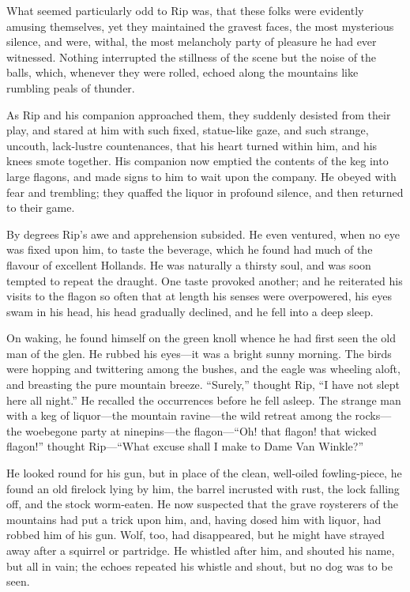 What seemed particularly odd to Rip was, that these folks were evidently amusing themselves, yet they maintained the gravest faces, the most mysterious silence, and were, withal, the most melancholy party of pleasure he had ever witnessed. Nothing interrupted the stillness of the scene but the noise of the balls, which, whenever they were rolled, echoed along the mountains like rumbling peals of thunder.


As Rip and his companion approached them, they suddenly desisted from their play, and stared at him with such fixed, statue-like gaze, and such strange, uncouth, lack-lustre countenances, that his heart turned within him, and his knees smote together. His companion now emptied the contents of the keg into large flagons, and made signs to him to wait upon the company. He obeyed with fear and trembling; they quaffed the liquor in profound silence, and then returned to their game.

By degrees Rip’s awe and apprehension subsided. He even ventured, when no eye was fixed upon him, to taste the beverage, which he found had much of the flavour of excellent Hollands. He was naturally a thirsty soul, and was soon tempted to repeat the draught. One taste provoked another; and he reiterated his visits to the flagon so often that at length his senses were overpowered, his eyes swam in his head, his head gradually declined, and he fell into a deep sleep.

On waking, he found himself on the green knoll whence he had first seen the old man of the glen. He rubbed his eyes—it was a bright sunny morning. The birds were hopping and twittering among the bushes, and the eagle was wheeling aloft, and breasting the pure mountain breeze. “Surely,” thought Rip, “I have not slept here all night.” He recalled the occurrences before he fell asleep. The strange man with a keg of liquor—the mountain ravine—the wild retreat among the rocks—the woebegone party at ninepins—the flagon—“Oh! that flagon! that wicked flagon!” thought Rip—“What excuse shall I make to Dame Van Winkle?”

He looked round for his gun, but in place of the clean, well-oiled fowling-piece, he found an old firelock lying by him, the barrel incrusted with rust, the lock falling off, and the stock worm-eaten. He now suspected that the grave roysterers of the mountains had put a trick upon him, and, having dosed him with liquor, had robbed him of his gun. Wolf, too, had disappeared, but he might have strayed away after a squirrel or partridge. He whistled after him, and shouted his name, but all in vain; the echoes repeated his whistle and shout, but no dog was to be seen.



